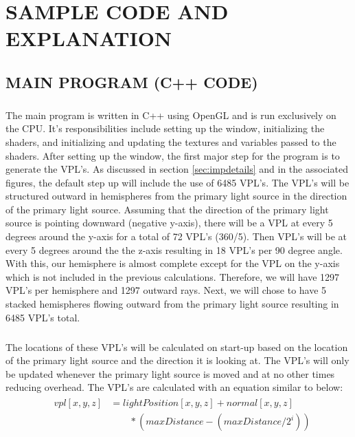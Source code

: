 \chapter{SAMPLE CODE AND EXPLANATION}

\section{MAIN PROGRAM (C++ CODE)}
\paragraph{}
The main program is written in C++ using OpenGL and is run exclusively on the CPU.  It's responsibilities include setting up the window, initializing the shaders, and initializing and updating the textures and variables passed to the shaders.  After setting up the window, the first major step for the program is to generate the VPL's.  As discussed in section \ref{sec:impdetails} and in the associated figures, the default step up will include the use of 6485 VPL's.  The VPL's will be structured outward in hemispheres from the primary light source in the direction of the primary light source.  Assuming that the direction of the primary light source is pointing downward (negative y-axis), there will be a VPL at every 5 degrees around the y-axis for a total of 72 VPL's (360/5).  Then VPL's will be at every 5 degrees around the the z-axis resulting in 18 VPL's per 90 degree angle.  With this, our hemisphere is almost complete except for the VPL on the y-axis which is not included in the previous calculations. Therefore, we will have 1297 VPL's per hemisphere and 1297 outward rays.  Next, we will chose to have 5 stacked hemispheres flowing outward from the primary light source resulting in 6485 VPL's total.  

\paragraph{}
The locations of these VPL's will be calculated on start-up based on the location of the primary light source and the direction it is looking at.  The VPL's will only be updated whenever the primary light source is moved and at no other times reducing overhead.  The VPL's are calculated with an equation similar to below:
\begin{align}
  &\begin{aligned} \label{eqn:vplPosition}
    vpl[x,y,z] &= lightPosition[x,y,z] + normal[x,y,z]\\
      &\qquad *(maxDistance - (maxDistance/2^i))
  \end{aligned}
\end{align}

